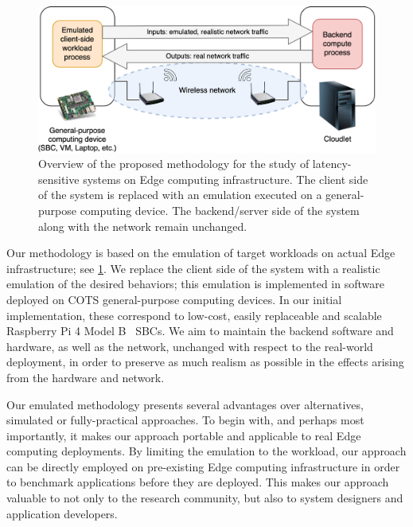 \begin{figure}
    \centering
    \includegraphics[width=.8\textwidth]{Figs/methodology}
    \caption{%
        Overview of the proposed methodology for the study of latency-sensitive systems on Edge computing infrastructure.
        The  client side of the system is replaced with an emulation executed on a general-purpose computing device.
        The backend/server side of the system along with the network remain unchanged.
    }\label{fig:methodology}
\end{figure}

Our methodology is based on the emulation of target workloads on actual Edge infrastructure;
see \cref{fig:methodology}.
We replace the client side of the system with a realistic emulation of the desired behaviors;
this emulation is implemented in software deployed on \gls{COTS} general-purpose computing devices.
In our initial implementation, these correspond to low-cost, easily replaceable and scalable Raspberry Pi 4 Model B~\cite{raspberrypi} \glspl{SBC}.
We aim to maintain the backend software and hardware, as well as the network, unchanged with respect to the real-world deployment, in order to preserve as much realism as possible in the effects arising from the hardware and network.

Our emulated methodology presents several advantages over alternatives, simulated or fully-practical approaches.
To begin with, and perhaps most importantly, it makes our approach portable and applicable to real Edge computing deployments.
By limiting the emulation to the workload, our approach can be directly employed on pre-existing Edge computing infrastructure in order to benchmark applications before they are deployed.
This makes our approach valuable to not only to the research community, but also to system designers and application developers.

